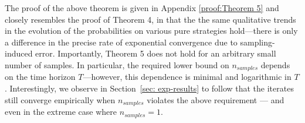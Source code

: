The proof of the above theorem is given in Appendix \ref{proof:Theorem 5} and closely resembles the proof of Theorem 4, in that the the same qualitative trends in the evolution of the probabilities on various pure strategies hold---there is only a difference in the precise rate of exponential convergence due to sampling-induced error. Importantly, Theorem 5 does not hold for an arbitrary small number of samples. In particular, the required lower bound on $n_{samples}$ depends on the time horizon $T$---however, this dependence is minimal and logarithmic in $T$.
Interestingly, we observe in Section~\ref{sec: exp-results} to follow that the iterates still converge empirically when $n_{samples}$ violates the above requirement --- and even in the extreme case where $n_{samples} = 1$.

